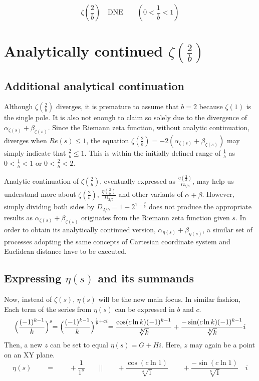 \documentclass{amsart}
\begin{document}
	\[ \zeta(\frac{2}{b}) \quad \text{DNE} \qquad (0 < \frac{1}{b} < 1) \]
	
	
	\section{Analytically continued $\zeta(\frac{2}{b})$}
	\subsection{Additional analytical continuation}
	Although $\zeta(\frac{2}{b})$ diverges, it is premature to assume that $b=2$ because $\zeta(1)$ is the single pole. It is also not enough to claim so solely due to the divergence of $\alpha_{\zeta(s)} + \beta_{\zeta(s)}$. Since the Riemann zeta function, without analytic continuation, diverges when $Re(s) \leq 1$, the equation $\zeta(\frac{2}{b}) = -2(\alpha_{\zeta(s)} + \beta_{\zeta(s)})$ may simply indicate that $\frac{2}{b} \leq 1$. This is within the initially defined range of $\frac{1}{b}$ as $0 < \frac{1}{b} < 1$ or $0 < \frac{2}{b} < 2$.
	
	Analytic continuation of $\zeta(\frac{2}{b})$, eventually expressed as $\frac{\eta(\frac{2}{b})}{D_{2/b}}$, may help us understand more about $\zeta(\frac{2}{b})$, $\frac{\eta(\frac{2}{b})}{D_{2/b}}$ and other variants of $\alpha + \beta$. However, simply dividing both sides by $D_{2/b} = 1 - 2^{1-\frac{2}{b}}$ does not produce the appropriate results as $\alpha_{\zeta(s)} + \beta_{\zeta(s)}$ originates from the Riemann zeta function given $s$. In order to obtain its analytically continued version, $\alpha_{\eta(s)} + \beta_{\eta(s)}$, a similar set of processes adopting the same concepts of Cartesian coordinate system and Euclidean distance have to be executed.
	
	\subsection{Expressing $\eta(s)$ and its summands}
	Now, instead of $\zeta(s)$, $\eta(s)$ will be the new main focus. In similar fashion, Each term of the series from $\eta(s)$ can be expressed in $b$ and $c$.
	\[ \Bigl( \frac{(-1)^{k-1}}{k} \Bigl)^s = \Bigl( \frac{(-1)^{k-1}}{k} \Bigl)^{\frac{1}{b} + ci} = \frac{\cos({c\ln k})(-1)^{k-1}}{\sqrt[b]{k}} + \frac{-\sin({c\ln k})(-1)^{k-1}}{\sqrt[b]{k}} i \]
	Then, a new $z$ can be set to equal $\eta(s) = G + Hi$. Here, $z$ may again be a point on an XY plane.
	\[ \eta(s) \qquad = \qquad +\frac{1}{1^s} \qquad \Big|\Big|  \qquad +\frac{\cos({c\ln 1})}{\sqrt[b]{1}} \qquad +\frac{-\sin({c\ln 1})}{\sqrt[b]{1}} \quad i  \]
	
\end{document}
